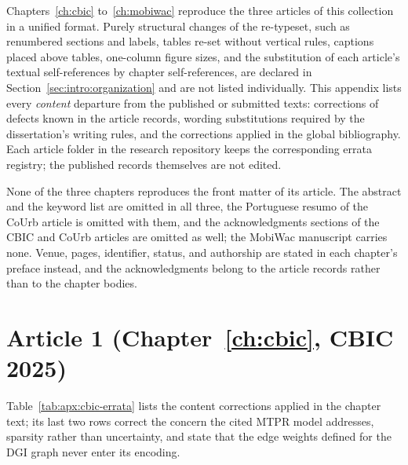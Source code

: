 Chapters~\ref{ch:cbic} to~\ref{ch:mobiwac} reproduce the three articles of this
collection in a unified format. Purely structural changes of the re-typeset, such as
renumbered sections and labels, tables re-set without vertical rules, captions placed
above tables, one-column figure sizes, and the substitution of each article's textual
self-references by chapter self-references, are declared in
Section~\ref{sec:intro:organization} and are
not listed individually. This appendix lists every \emph{content} departure from the
published or submitted texts: corrections of defects known in the article records,
wording substitutions required by the dissertation's writing rules, and the
corrections applied in the global bibliography. Each article folder in the research
repository keeps the corresponding errata registry; the published records themselves
are not edited.

None of the three chapters reproduces the front matter of its article. The abstract and
the keyword list are omitted in all three, the Portuguese resumo of the CoUrb article is
omitted with them, and the acknowledgments sections of the CBIC and CoUrb articles are
omitted as well; the MobiWac manuscript carries none. Venue, pages, identifier, status,
and authorship are stated in each chapter's preface instead, and the acknowledgments
belong to the article records rather than to the chapter bodies.

\section{Article 1 (Chapter~\ref{ch:cbic}, CBIC 2025)}
\label{apx:errata:cbic}

Table~\ref{tab:apx:cbic-errata} lists the content corrections applied in the chapter
text; its last two rows correct the concern the cited MTPR model addresses, sparsity rather
than uncertainty, and state that the edge weights defined for the DGI graph never enter its
encoding.



